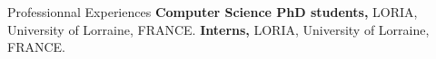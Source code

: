 \begin{rubric}{Professionnal Experiences}
%
	\textbf{Computer Science PhD students,} LORIA, University of Lorraine, FRANCE.
%
%
\entry*[2013 -- 2015]%
	\textbf{Interns,} LORIA, University of Lorraine, FRANCE.
%
\end{rubric}

